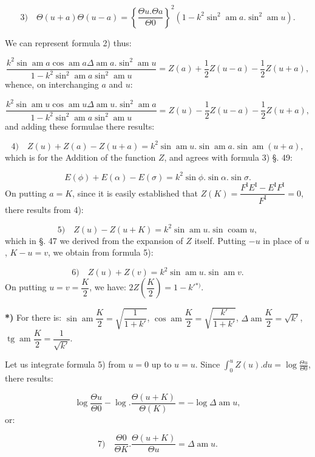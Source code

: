 \documentclass{article}
\begin{document}
\[
\text{3)}\quad \Theta(u+a)\Theta(u-a)=\left\{\frac{\Theta u.\Theta a}{\Theta0}\right\}^{2}\left(1-k^{2}\sin^{2}\operatorname{am}a.\sin^{2}\operatorname{am}u\right).
\]

We can represent formula 2) thus:

\[
\frac{k^{2}\sin\operatorname{am}a\cos\operatorname{am}a\Delta\operatorname{am}a.\sin^{2}\operatorname{am}u}{1-k^{2}\sin^{2}\operatorname{am}a\sin^{2}\operatorname{am}u}=Z(a)+\frac{1}{2}Z(u-a)-\frac{1}{2}Z(u+a),
\]
whence, on interchanging $a$ and $u$:

\[
\frac{k^{2}\sin\operatorname{am}u\cos\operatorname{am}u\Delta\operatorname{am}u.\sin^{2}\operatorname{am}a}{1-k^{2}\sin^{2}\operatorname{am}a\sin^{2}\operatorname{am}u}=Z(u)-\frac{1}{2}Z(u-a)-\frac{1}{2}Z(u+a),
\]
and adding these formulae there results:

\[
\text{4)}\quad Z(u)+Z(a)-Z(u+a)=k^{2}\sin\operatorname{am}u.\sin\operatorname{am}a.\sin\operatorname{am}(u+a),
\]
which is for the Addition of the function $Z$, and agrees with formula 3) §. 49:

\[
E(\phi)+E(\alpha)-E(\sigma)=k^{2}\sin\phi.\sin\alpha.\sin\sigma.
\]
On putting $a=K$, since it is easily established that $Z(K)=\dfrac{F^{\mathrm{I}}E^{\mathrm{I}}-E^{\mathrm{I}}F^{\mathrm{I}}}{F^{\mathrm{I}}}=0$, there results from 4):

\[
\text{5)}\quad Z(u)-Z(u+K)=k^{2}\sin\operatorname{am}u.\sin\operatorname{coam}u,
\]
which in §. 47 we derived from the expansion of $Z$ itself. Putting $-u$ in place of $u$, $K-u=v$, we obtain from formula 5):

\[
\text{6)}\quad Z(u)+Z(v)=k^{2}\sin\operatorname{am}u.\sin\operatorname{am}v.
\]
On putting $u=v=\dfrac{K}{2}$, we have: $2Z\left(\dfrac{K}{2}\right)=1-k'{}^{*)}$.

\textbf{*)} For there is: $\sin\operatorname{am}\dfrac{K}{2}=\sqrt{\dfrac{1}{1+k'}}$, $\cos\operatorname{am}\dfrac{K}{2}=\sqrt{\dfrac{k'}{1+k'}}$, $\Delta\operatorname{am}\dfrac{K}{2}=\sqrt{k'}$, $\operatorname{tg}\operatorname{am}\dfrac{K}{2}=\dfrac{1}{\sqrt{k'}}$.

Let us integrate formula 5) from $u=0$ up to $u=u$. Since $\displaystyle\int_{0}^{u}Z(u).du=\log\frac{\Theta u}{\Theta0}$, there results:

\[
\log\frac{\Theta u}{\Theta0}-\log.\frac{\Theta(u+K)}{\Theta(K)}=-\log\Delta\operatorname{am}u,
\]
or:

\[
\text{7)}\quad \frac{\Theta0}{\Theta K}.\frac{\Theta(u+K)}{\Theta u}=\Delta\operatorname{am}u.
\]
\end{document}

